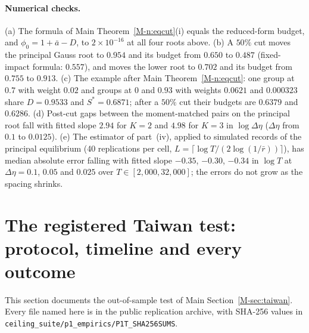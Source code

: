 \documentclass[12pt]{article}
\theoremstyle{definition}
\theoremstyle{remark}
\begin{document}
\paragraph{Numerical checks.} (a) The formula of Main Theorem~\ref{M-n:eqcut}(i) equals the reduced-form budget, and $\phi_0 = 1 + \bar a - D$, to $2 \times 10^{-16}$ at all four roots above. (b) A $50\%$ cut moves the principal Gauss root to $0.954$ and its budget from $0.650$ to $0.487$ (fixed-impact formula: $0.557$), and moves the lower root to $0.702$ and its budget from $0.755$ to $0.913$. (c) The example after Main Theorem~\ref{M-n:eqcut}: one group at $0.7$ with weight $0.02$ and groups at $0$ and $0.93$ with weights $0.0621$ and $0.000323$ share $D = 0.9533$ and $S^* = 0.6871$; after a $50\%$ cut their budgets are $0.6379$ and $0.6286$. (d) Post-cut gaps between the moment-matched pairs on the principal root fall with fitted slope $2.94$ for $K = 2$ and $4.98$ for $K = 3$ in $\log\Delta\eta$ ($\Delta\eta$ from $0.1$ to $0.0125$). (e) The estimator of part~(iv), applied to simulated records of the principal equilibrium (40 replications per cell, $L = \lceil\log T/(2\log(1/\bar r))\rceil$), has median absolute error falling with fitted slope $-0.35$, $-0.30$, $-0.34$ in $\log T$ at $\Delta\eta = 0.1$, $0.05$ and $0.025$ over $T \in [2{,}000, 32{,}000]$; the errors do not grow as the spacing shrinks.

\section{The registered Taiwan test: protocol, timeline and every outcome}\label{sec:p1t}

This section documents the out-of-sample test of Main Section~\ref{M-sec:taiwan}. Every file named here is in the public replication archive, with SHA-256 values in \nolinkurl{ceiling_suite/p1_empirics/P1T_SHA256SUMS}.
\end{document}
